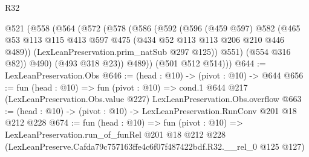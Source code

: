 \begin{lexlean}{R32}
\begin{coremodule}
      @521
        (@558
          (@564
            (@572
              (@578
                (@586
                  (@592
                    (@596
                      (@459 @597)
                      @582
                      (@465 @53 @113 @115 @413 @597 @475 (@434 @52 @113 @113 @206 @210 @446 @489))
                      (LexLeanPreservation.prim_natSub @297 @125))
                    @551)
                  (@554 @316 @82))
                @490)
              (@493 @318 @23))
            @489))
        (@501 @512 @514)))
@644 := LexLeanPreservation.Obs
@646 := (head : @10) -> (pivot : @10) -> @644
@656 := fun (head : @10) =>
  fun (pivot : @10) =>
  cond.{1} @644 @217 (LexLeanPreservation.Obs.value @227) LexLeanPreservation.Obs.overflow
@663 := (head : @10) -> (pivot : @10) -> LexLeanPreservation.RunConv @201 @18 @212 @228
@674 := fun (head : @10) =>
  fun (pivot : @10) =>
  LexLeanPreservation.run_of_funRel
    @201
    @18
    @212
    @228
    (LexLeanPreserve.Cafda79c757163ffe4c6f07f487422bdf.R32.__rel_0 @125 @127)
\end{coremodule}
\end{lexlean}

